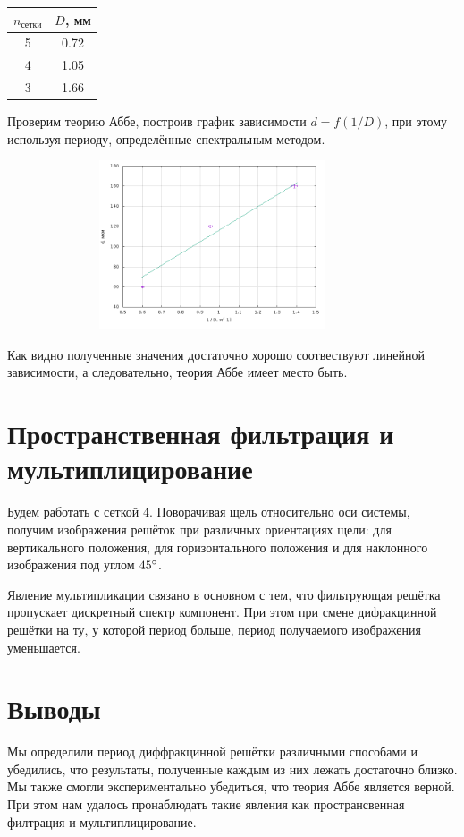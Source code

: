 \documentclass[12pt]{article}
\begin{document}
\begin{table}[h!]
	\centering
	\begin{tabular}{|c|c|}
	\hline
		$n_\text{сетки}$ & $D$, мм \\	
	\hline
		5 & 0.72 \\
	\hline
		4 & 1.05 \\
	\hline
		3 & 1.66 \\
	\hline
	\end{tabular}	
\end{table}

\par
	Проверим теорию Аббе, построив график зависимости $d = 	f(1 / D)$, при этому используя периоду, определённые спектральным методом.
\begin{figure}[h!]
	\centering
	\includegraphics[width = 10cm, height = 5cm]{plot1.png}
\end{figure}
\par
	Как видно полученные значения достаточно хорошо соотвествуют линейной зависимости, а следовательно, теория Аббе имеет место быть.
\section*{Пространственная фильтрация и мультиплицирование}
\par
	Будем работать с сеткой 4. Поворачивая щель относительно оси системы, получим изображения решёток при различных ориентациях щели: для вертикального положения, для горизонтального положения и для наклонного изображения под углом $45 \degree$.
\par
	Явление мультипликации связано в основном с тем, что фильтрующая решётка пропускает дискретный спектр компонент. При этом при смене дифракцинной решётки на ту, у которой период больше, период получаемого изображения уменьшается.

\section*{Выводы}
\par
	Мы определили период диффракцинной решётки различными способами и убедились, что результаты, полученные каждым из них лежать достаточно близко. Мы также смогли экспериментально убедиться, что теория Аббе является верной. При этом нам удалось пронаблюдать такие явления как пространсвенная филтрация и мультиплицирование.
\end{document}
